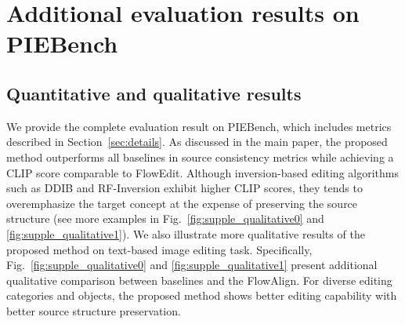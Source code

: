 \begin{table}[H]
    \centering
    \vspace{0.1cm}
    \caption{Runtime comparison (unit: seconds). Averaged time for 50 samples is reported.}
    \label{tab:runtime}
\end{table}

\section{Additional evaluation results on PIEBench}
\label{sec:complete}
\subsection{Quantitative and qualitative results}
We provide the complete evaluation result on PIEBench, which includes metrics described in Section~\ref{sec:details}.
As discussed in the main paper, the proposed method outperforms all baselines in source consistency metrics while achieving a CLIP score comparable to FlowEdit. Although inversion-based editing algorithms such as DDIB and RF-Inversion exhibit higher CLIP scores, they tends to overemphasize the target concept at the expense of preserving the source structure (see more examples in Fig.~\ref{fig:supple_qualitative0} and \ref{fig:supple_qualitative1}).
We also illustrate more qualitative results of the proposed method on text-based image editing task.
Specifically, Fig.~\ref{fig:supple_qualitative0} and \ref{fig:supple_qualitative1} present additional qualitative comparison between baselines and the FlowAlign. For diverse editing categories and objects, the proposed method shows better editing capability with better source structure preservation.

